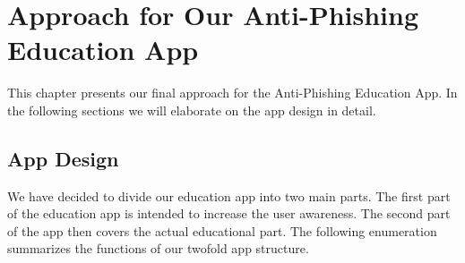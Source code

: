 
\section{Approach for Our Anti-Phishing Education App}
\label{s:approach}
This chapter presents our final approach for the Anti-Phishing Education App. In the following sections we will elaborate on the app design in detail.
\subsection{App Design}
\label{s:app_design}
We have decided to divide our education app into two main parts. The first part of the education app is intended to increase the user awareness. The second part of the app then covers the actual educational part. The following enumeration summarizes the functions of our twofold app structure.


